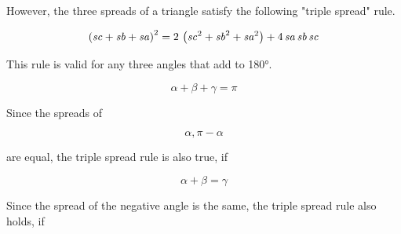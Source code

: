 \documentclass[a4paper,10pt]{article}
\begin{document}
\begin{eulernotebook}
\begin{eulercomment}
\begin{eulercomment}
\begin{eulercomment}
\begin{eulercomment}
\begin{eulercomment}
However, the three spreads of a triangle satisfy the following "triple spread" rule.
\end{eulercomment}
\begin{eulerformula}
\[
\left({\it sc}+{\it sb}+{\it sa}\right)^2=2\,\left({\it sc}^2+
 {\it sb}^2+{\it sa}^2\right)+4\,{\it sa}\,{\it sb}\,{\it sc}
\]
\end{eulerformula}
\begin{eulercomment}
This rule is valid for any three angles that add to 180°.

\end{eulercomment}
\begin{eulerformula}
\[
\alpha+\beta+\gamma=\pi
\]
\end{eulerformula}
\begin{eulercomment}
Since the spreads of

\end{eulercomment}
\begin{eulerformula}
\[
\alpha, \pi-\alpha
\]
\end{eulerformula}
\begin{eulercomment}
are equal, the triple spread rule is also true, if

\end{eulercomment}
\begin{eulerformula}
\[
\alpha+\beta=\gamma
\]
\end{eulerformula}
\begin{eulercomment}
Since the spread of the negative angle is the same, the triple spread
rule also holds, if


\end{eulercomment}
\end{eulercomment}
\end{eulercomment}
\end{eulercomment}
\end{eulercomment}
\end{eulernotebook}
\end{document}

